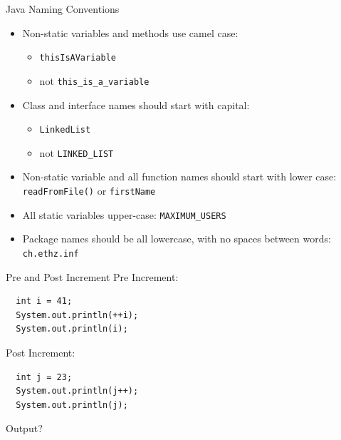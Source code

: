 \begin{frame}[fragile]{Java Naming Conventions}
  \begin{itemize}
  \item Non-static variables and methods use camel case:
    \begin{itemize}
    \item \lstinline!thisIsAVariable!
    \item \alert{not} \lstinline!this_is_a_variable!
    \end{itemize}
  \item Class and interface names should start with capital:
    \begin{itemize}
    \item \lstinline!LinkedList!
    \item \alert{not} \lstinline!LINKED_LIST!
    \end{itemize}
  \item Non-static variable and all function names should start with
    lower case: \lstinline!readFromFile()! or \lstinline!firstName!
  \item All static variables upper-case: \lstinline!MAXIMUM_USERS!
  \item Package names should be all lowercase, with no spaces between
    words: \lstinline!ch.ethz.inf!
  \end{itemize}
\end{frame}

\begin{frame}[fragile]{Pre and Post Increment}
  Pre Increment:


  \begin{lstlisting}
  int i = 41;
  System.out.println(++i);
  System.out.println(i);
  \end{lstlisting}


  Post Increment:


  \begin{lstlisting}
  int j = 23;
  System.out.println(j++);
  System.out.println(j);
  \end{lstlisting}


  Output?
\end{frame}

